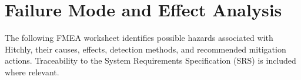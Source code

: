 \documentclass{article}
\begin{document}

\section{Failure Mode and Effect Analysis}


The following FMEA worksheet identifies possible hazards associated with Hitchly, their causes,
effects, detection methods, and recommended mitigation actions. Traceability to the System
Requirements Specification (SRS) is included where relevant.
\end{document}
